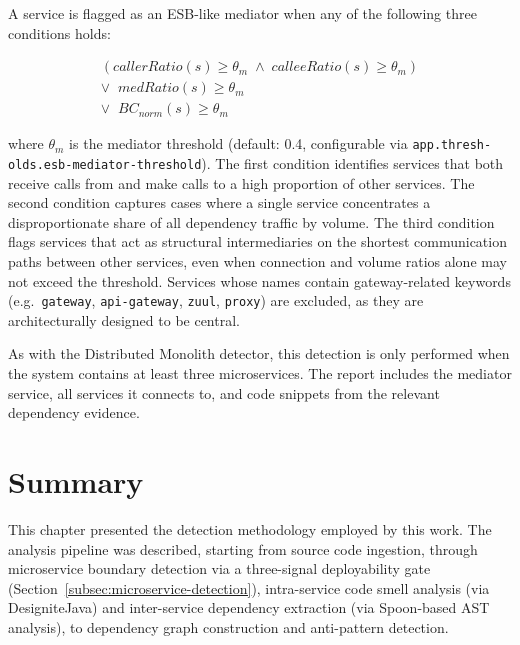 A service is flagged as an ESB-like mediator when any of the following three conditions holds:

\begin{equation}
    \begin{array}{c}
        (\mathit{callerRatio}(s) \geq \theta_m \;\wedge\; \mathit{calleeRatio}(s) \geq \theta_m) \\[4pt]
        \vee\;\; \mathit{medRatio}(s) \geq \theta_m \\[4pt]
        \vee\;\; BC_{\mathit{norm}}(s) \geq \theta_m
    \end{array}
    \label{eq:esb-decision}
\end{equation}

\noindent where $\theta_m$ is the mediator threshold (default: 0.4, configurable via \texttt{app.thres\-h-olds.esb-mediator-threshold}). The first condition identifies services that both receive calls from and make calls to a high proportion of other services. The second condition captures cases where a single service concentrates a disproportionate share of all dependency traffic by volume. The third condition flags services that act as structural intermediaries on the shortest communication paths between other services, even when connection and volume ratios alone may not exceed the threshold. Services whose names contain gateway-related keywords (e.g.\ \texttt{gateway}, \texttt{api-gateway}, \texttt{zuul}, \texttt{proxy}) are excluded, as they are architecturally designed to be central.

As with the Distributed Monolith detector, this detection is only performed when the system contains at least three microservices. The report includes the mediator service, all services it connects to, and code snippets from the relevant dependency evidence.

\section{Summary}
\label{sec:summary}

\par This chapter presented the detection methodology employed by this work. The analysis pipeline was described, starting from source code ingestion, through microservice boundary detection via a three-signal deployability gate (Section~\ref{subsec:microservice-detection}), intra-service code smell analysis (via DesigniteJava) and inter-service dependency extraction (via Spoon-based AST analysis), to dependency graph construction and anti-pattern detection.

